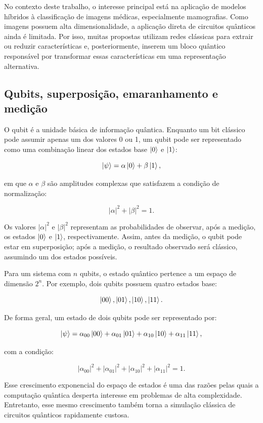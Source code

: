 \documentclass[
    12pt,
    openright,
    oneside,
    a4paper,
    english,
    brazil
]{abntex2}
\begin{document}
No contexto deste trabalho, o interesse principal está na aplicação de modelos híbridos à classificação de imagens médicas, especialmente mamografias. Como imagens possuem alta dimensionalidade, a aplicação direta de circuitos quânticos ainda é limitada. Por isso, muitas propostas utilizam redes clássicas para extrair ou reduzir características e, posteriormente, inserem um bloco quântico responsável por transformar essas características em uma representação alternativa.

\subsection{Qubits, superposição, emaranhamento e medição}

O qubit é a unidade básica de informação quântica. Enquanto um bit clássico pode assumir apenas um dos valores 0 ou 1, um qubit pode ser representado como uma combinação linear dos estados base \(\ket{0}\) e \(\ket{1}\):

\[
\ket{\psi} = \alpha\ket{0} + \beta\ket{1},
\]

em que \(\alpha\) e \(\beta\) são amplitudes complexas que satisfazem a condição de normalização:

\[
|\alpha|^2 + |\beta|^2 = 1.
\]

Os valores \(|\alpha|^2\) e \(|\beta|^2\) representam as probabilidades de observar, após a medição, os estados \(\ket{0}\) e \(\ket{1}\), respectivamente. Assim, antes da medição, o qubit pode estar em superposição; após a medição, o resultado observado será clássico, assumindo um dos estados possíveis.

Para um sistema com \(n\) qubits, o estado quântico pertence a um espaço de dimensão \(2^n\). Por exemplo, dois qubits possuem quatro estados base:

\[
\ket{00}, \ket{01}, \ket{10}, \ket{11}.
\]

De forma geral, um estado de dois qubits pode ser representado por:

\[
\ket{\psi} =
\alpha_{00}\ket{00}
+
\alpha_{01}\ket{01}
+
\alpha_{10}\ket{10}
+
\alpha_{11}\ket{11},
\]

com a condição:

\[
|\alpha_{00}|^2 +
|\alpha_{01}|^2 +
|\alpha_{10}|^2 +
|\alpha_{11}|^2 = 1.
\]

Esse crescimento exponencial do espaço de estados é uma das razões pelas quais a computação quântica desperta interesse em problemas de alta complexidade. Entretanto, esse mesmo crescimento também torna a simulação clássica de circuitos quânticos rapidamente custosa.
\end{document}
